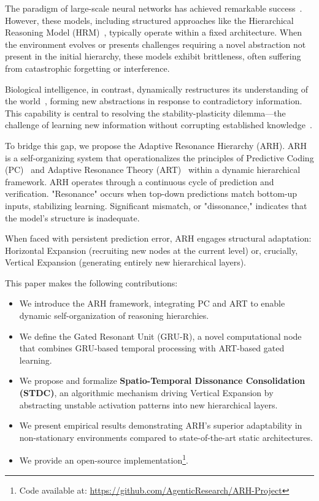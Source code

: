\documentclass{article}
\begin{document}
The paradigm of large-scale neural networks has achieved remarkable success~\cite{Transformer2017}. However, these models, including structured approaches like the Hierarchical Reasoning Model (HRM)~\cite{HRM2025}, typically operate within a fixed architecture. When the environment evolves or presents challenges requiring a novel abstraction not present in the initial hierarchy, these models exhibit brittleness, often suffering from catastrophic forgetting or interference.

Biological intelligence, in contrast, dynamically restructures its understanding of the world~\cite{Piaget1954}, forming new abstractions in response to contradictory information. This capability is central to resolving the stability-plasticity dilemma—the challenge of learning new information without corrupting established knowledge~\cite{Grossberg1987}.

To bridge this gap, we propose the Adaptive Resonance Hierarchy (ARH). ARH is a self-organizing system that operationalizes the principles of Predictive Coding (PC)~\cite{Rao1999} and Adaptive Resonance Theory (ART)~\cite{Grossberg1987} within a dynamic hierarchical framework. ARH operates through a continuous cycle of prediction and verification. "Resonance" occurs when top-down predictions match bottom-up inputs, stabilizing learning. Significant mismatch, or "dissonance," indicates that the model's structure is inadequate.

When faced with persistent prediction error, ARH engages structural adaptation: Horizontal Expansion (recruiting new nodes at the current level) or, crucially, Vertical Expansion (generating entirely new hierarchical layers).

This paper makes the following contributions:
\begin{itemize}
    \item We introduce the ARH framework, integrating PC and ART to enable dynamic self-organization of reasoning hierarchies.
    \item We define the Gated Resonant Unit (GRU-R), a novel computational node that combines GRU-based temporal processing with ART-based gated learning.
    \item We propose and formalize \textbf{Spatio-Temporal Dissonance Consolidation (STDC)}, an algorithmic mechanism driving Vertical Expansion by abstracting unstable activation patterns into new hierarchical layers.
    \item We present empirical results demonstrating ARH's superior adaptability in non-stationary environments compared to state-of-the-art static architectures.
    \item We provide an open-source implementation\footnote{Code available at: \url{https://github.com/AgenticResearch/ARH-Project}}.
\end{itemize}
\end{document}
